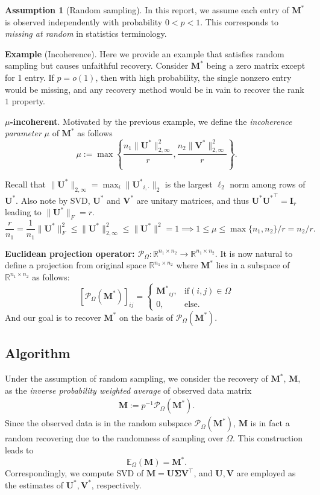 \documentclass[12pt]{article}
\theoremstyle{remark}
\newcommand{\bs}[1]{{\boldsymbol{#1}^*}}
\newcommand{\bb}[1]{{\boldsymbol {#1}}}
\begin{document}
\noindent\textbf{Assumption 1} (Random sampling). 
In this report, we assume each entry of $\bs M$ is observed independently with probability $0<p<1$. 
This corresponds to \textit{missing at random} in statistics terminology.

\noindent\textbf{Example} (Incoherence).
Here we provide an example that satisfies random sampling but causes unfaithful recovery.
Consider $\bs M$ being a zero matrix except for 1 entry. If $p = o(1)$, then with high probability, the single nonzero entry would be missing, and any recovery method would be in vain to recover the rank $1$ property.

\noindent \textbf{$\mu$-incoherent}.
Motivated by the previous example, we define the \textit{incoherence parameter} $\mu$ of $\bs M$ as follows
\[
\mu:= \max\left\{
\frac{n_1\|\bs U\|_{2,\infty}^2}{r},
 \frac{n_2\|\bs V\|_{2,\infty}^2}{r}
 \right\}.
\]

Recall that 
$\|\bs U\|_{2,\infty} = \max_i\|\bs U_{i,\cdot}\|_2$ is the largest $\ell_2$ norm among rows of $\bs U$.
Also note by SVD, $\bs U$ and $\bs V$ are unitary matrices, and thus $\bs U\bs U^\top = \mathbf I_r$ leading to $\|\bs U\|_F = r$.
\[
\frac{r}{n_1} = \frac{1}{n_1}\|\bs U\|_F^2
\leq 
\|\bs U\|_{2,\infty}^2
\leq\|\bs U\|^2 = 1\implies
1\leq \mu\leq \max\{n_1, n_2\} /r = n_2/r.
\]


\noindent \textbf{Euclidean projection operator: $\mathcal P_\Omega: \mathbb R^{n_1\times n_2}\to \mathbb R^{n_1\times n_2}$}.
It is now natural to define a projection from original space $\mathbb R^{n_1\times n_2}$ where $\bs M$ lies in a subspace of $\mathbb R^{n_1\times n_2}$ as follows:
$$
[\mathcal P_{\Omega} (\bs M)]_{ij} = 
\begin{cases}
\bs M_{ij}, &\mathrm{ if } (i,j)\in\Omega\\
0, &\mathrm{ else.}
\end{cases}
$$
And our goal is to recover $\bs M$ on the basis of $\mathcal P_\Omega (\bs M)$.


\subsection{Algorithm}
Under the assumption of random sampling, we consider the recovery of $\bs M$, $\bb M$, as the \textit{inverse probability weighted average} of observed data matrix
\begin{align}
    \bb{M}:= p^{-1} \mathcal P_\Omega (\bs {M}).
\end{align}
Since the observed data is in the random subspace $\mathcal P_\Omega (\bs {M})$, 
$\bb M$ is in fact a random recovering due to the randomness of sampling over $\Omega$.
This construction leads to
$$\mathbb E_\Omega (\bb M) = \bs M.$$
Correspondingly, 
we compute SVD of $\bb M = \bb U \bb \Sigma \bb V^\top$,
and 
$\bb U, \bb V$ are employed as the estimates of 
$\bs U, \bs V$, respectively.
\end{document}
